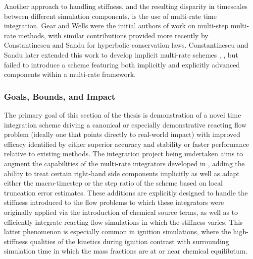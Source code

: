 Another approach to handling stiffness, and the resulting disparity in
timescales between different simulation components, is the use of multi-rate
time integration. Gear and Wells \cite{gear1984multirate} were the initial authors of
work on multi-step multi-rate methods, with similar contributions provided more
recently by Constantinescu and Sandu \cite{constantinescu2007multirate} for hyperbolic
conservation laws. Constantinescu and Sandu later extended this work to develop implicit
multi-rate schemes \cite{constantinescu2010extrapolated},
\cite{constantinescu2013extrapolated}, but failed to introduce a scheme featuring both
implicitly and explicitly advanced components within a multi-rate framework.

\subsubsection{Goals, Bounds, and Impact}

The primary goal of this section of the thesis is demonstration of a novel
time integration scheme driving a canonical or especially demonstrative
reacting flow problem (ideally one that points directly to real-world impact)
with improved efficacy identified by either superior accuracy and stability or
faster performance relative to existing methods. The integration project
being undertaken aims to augment the capabilities of the multi-rate integrators
developed in \cite{mikida2019multi}, adding the ability to treat certain
right-hand side components implicitly as well as adapt either the macro-timestep
or the step ratio of the scheme based on local truncation error estimates. These
additions are explicitly designed to handle the stiffness introduced to the flow
problems to which these integrators were originally applied via the introduction
of chemical source terms, as well as to efficiently integrate reacting flow
simulations in which the stiffness varies. This latter phenomenon is especially
common in ignition simulations, where the high-stiffness qualities of the
kinetics during ignition contrast with surrounding simulation time in which
the mass fractions are at or near chemical equilibrium.


